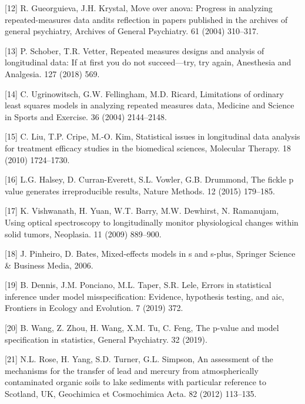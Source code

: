 \documentclass[
]{article}
\begin{document}
\leavevmode\hypertarget{ref-gueorguieva2004}{}%
{[}12{]} R. Gueorguieva, J.H. Krystal, Move over anova: Progress in analyzing repeated-measures data andits reflection in papers published in the archives of general psychiatry, Archives of General Psychiatry. 61 (2004) 310--317.

\leavevmode\hypertarget{ref-schober2018}{}%
{[}13{]} P. Schober, T.R. Vetter, Repeated measures designs and analysis of longitudinal data: If at first you do not succeed---try, try again, Anesthesia and Analgesia. 127 (2018) 569.

\leavevmode\hypertarget{ref-ugrinowitsch2004}{}%
{[}14{]} C. Ugrinowitsch, G.W. Fellingham, M.D. Ricard, Limitations of ordinary least squares models in analyzing repeated measures data, Medicine and Science in Sports and Exercise. 36 (2004) 2144--2148.

\leavevmode\hypertarget{ref-liu2010}{}%
{[}15{]} C. Liu, T.P. Cripe, M.-O. Kim, Statistical issues in longitudinal data analysis for treatment efficacy studies in the biomedical sciences, Molecular Therapy. 18 (2010) 1724--1730.

\leavevmode\hypertarget{ref-halsey2015}{}%
{[}16{]} L.G. Halsey, D. Curran-Everett, S.L. Vowler, G.B. Drummond, The fickle p value generates irreproducible results, Nature Methods. 12 (2015) 179--185.

\leavevmode\hypertarget{ref-vishwanath2009}{}%
{[}17{]} K. Vishwanath, H. Yuan, W.T. Barry, M.W. Dewhirst, N. Ramanujam, Using optical spectroscopy to longitudinally monitor physiological changes within solid tumors, Neoplasia. 11 (2009) 889--900.

\leavevmode\hypertarget{ref-pinheiro2006}{}%
{[}18{]} J. Pinheiro, D. Bates, Mixed-effects models in s and s-plus, Springer Science \& Business Media, 2006.

\leavevmode\hypertarget{ref-dennis2019}{}%
{[}19{]} B. Dennis, J.M. Ponciano, M.L. Taper, S.R. Lele, Errors in statistical inference under model misspecification: Evidence, hypothesis testing, and aic, Frontiers in Ecology and Evolution. 7 (2019) 372.

\leavevmode\hypertarget{ref-wang2019}{}%
{[}20{]} B. Wang, Z. Zhou, H. Wang, X.M. Tu, C. Feng, The p-value and model specification in statistics, General Psychiatry. 32 (2019).

\leavevmode\hypertarget{ref-rose2012}{}%
{[}21{]} N.L. Rose, H. Yang, S.D. Turner, G.L. Simpson, An assessment of the mechanisms for the transfer of lead and mercury from atmospherically contaminated organic soils to lake sediments with particular reference to Scotland, UK, Geochimica et Cosmochimica Acta. 82 (2012) 113--135.
\end{document}
